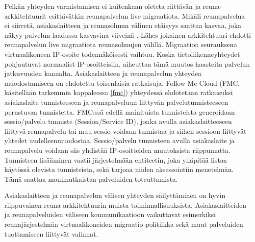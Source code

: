 Pelkän yhteyden varmistamisen ei kuitenkaan oleteta riittävän ja reuna-arkkitehtuurit esittävätkin reunapalvelun live migraatiota.
Mikäli reunapalvelua ei siirretä, asiakaslaitteen ja reunasolmun välinen etäisyys saattaa kasvaa, joka näkyy palvelun laadussa kasvavina viiveinä \cite{taleb2013follow, wang2015mobiscud}.
Lähes jokainen arkkitehtuuri ehdotti reunapalvelun live migraatiota reunasolmujen välillä.
Migraation seurauksena virtuaalikoneen IP-osoite todennäköisesti vaihtuu. Koska tietoliikenneyhteydet pohjautuvat normaalist IP-osoitteisiin, aiheuttaa tämä muutos haasteita palvelun jatkuvuuden kannalta.
Asiakaslaitteen ja reunapalvelun yhteyden muodostamiseen on ehdotettu toisenlaisia ratkaisuja.
Follow Me Cloud (FMC, käsitellään tarkemmin kappaleessa \ref{fmc}) yhteydessä ehdotetaan ratkaisuksi asiakaslaite tunnisteeseen ja reunapalveluun liittyvän palvelutunnisteeseen perustuvaa tunnistetta.
FMC:ssä edellä mainituista tunnisteista generoidaan sessio/palvelu tunniste (Session/Service ID), jonka avulla asiakaslaitteeseen liittyvä reunapalvelu tai muu sessio voidaan tunnistaa ja siihen sessioon liittyvät yhtedet uudelleenmuodostaa.
Sessio/palvelu tunnisteen avulla asiakaslaite ja reunapalvelu voidaan siis yhdistää IP-osoitteiden muutoksista riippumatta.
Tunnisteen lisääminen vaatii järjestelmään entiteetin, joka ylläpitää listaa käytössä olevista tunnisteista, sekä tarjoaa niiden aksessointiin menetelmän. Tämä saattaa monimutkaistaa palveluiden toteuttamista. 

Asiakaslaitteen ja reunapalvelun välisen yhteyden säilyttäminen on hyvin riippuvainen reuna-arkkitehtuurin muista toiminnallisuuksista. Asiakaslaitteiden ja reunapalveluiden väliseen kommunikaatioon vaikuttavat esimerkiksi reunajärjestelmän virtuaalikoneiden migraatio politiikka sekä muut palveluiden tuottamiseen liittyvät valinnat.








